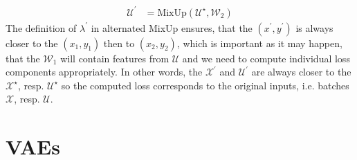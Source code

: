 \begin{enumerate}
\begin{align*}
            \mathcal{U}^\prime &= \text{MixUp}(\mathcal{U}^\star,\mathcal{W}_2)
        \end{align*}
        The definition of $\lambda^\prime$ in alternated MixUp ensures, that the $(x^\prime,y^\prime)$ is always closer to the 
        $(x_1,y_1)$ then to $(x_2,y_2)$, which is important as it may happen, that the $\mathcal{W}_1$ will contain features from $\mathcal{U}$
        and we need to compute individual loss components appropriately. In other words, the $\mathcal{X}^\prime$ and $\mathcal{U}^\prime$ are always 
        closer to the $\mathcal{X}^\star$, resp. $\mathcal{U}^\star$ so the computed loss corresponds to the original inputs, i.e. batches $\mathcal{X}$, 
        resp. $\mathcal{U}$.
\end{enumerate}



\section{VAEs}
